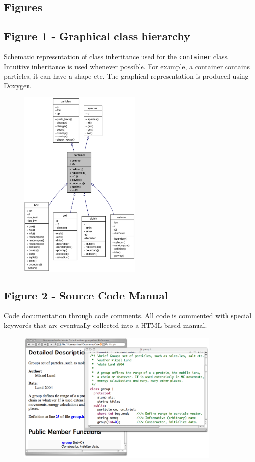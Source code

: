 \documentclass[10pt]{bmc_article}
\newenvironment{bmcformat}{\begin{raggedright}\baselineskip20pt\sloppy\setboolean{publ}{false}}{\end{raggedright}\baselineskip20pt\sloppy}
\begin{document}
\begin{bmcformat}

\section*{Figures}
  \subsection*{Figure 1 - Graphical class hierarchy}
      Schematic representation of class inheritance used for the
      \verb"container" class. Intuitive inheritance is used whenever possible.
      For example, a container contains particles, it can have a shape
      etc. The graphical representation is produced using Doxygen.
      \begin{figure}[ht]\center
      \includegraphics[width=6cm]{pics/container}
      \label{fig:container}
      \end{figure}

  \subsection*{Figure 2 - Source Code Manual}
      Code documentation through code comments. All code is commented with
      special keywords that are eventually collected into a HTML based manual.
      \begin{figure}[ht]\center
      \includegraphics[width=10cm]{pics/doxygen}
      \label{fig:doxygen}
      \end{figure}


\end{bmcformat}
\end{document}
